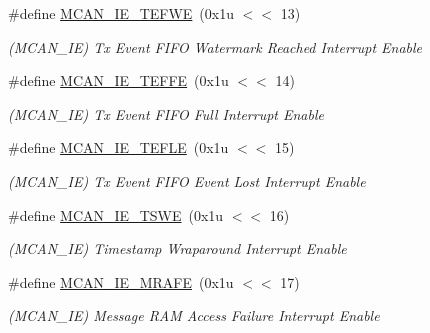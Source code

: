 \begin{DoxyCompactItemize}
\mbox{\label{group__SAME70__MCAN_ga5121f78a2022216daff6bd973c7e09e5}} 
\#define \mbox{\hyperlink{group__SAME70__MCAN_ga5121f78a2022216daff6bd973c7e09e5}{M\+C\+A\+N\+\_\+\+I\+E\+\_\+\+T\+E\+F\+WE}}~(0x1u $<$$<$ 13)
\begin{DoxyCompactList}\small\item\em (M\+C\+A\+N\+\_\+\+IE) Tx Event F\+I\+FO Watermark Reached Interrupt Enable \end{DoxyCompactList}\item 
\mbox{\label{group__SAME70__MCAN_ga192993fa1244bcfb8717d55db440943d}} 
\#define \mbox{\hyperlink{group__SAME70__MCAN_ga192993fa1244bcfb8717d55db440943d}{M\+C\+A\+N\+\_\+\+I\+E\+\_\+\+T\+E\+F\+FE}}~(0x1u $<$$<$ 14)
\begin{DoxyCompactList}\small\item\em (M\+C\+A\+N\+\_\+\+IE) Tx Event F\+I\+FO Full Interrupt Enable \end{DoxyCompactList}\item 
\mbox{\label{group__SAME70__MCAN_gac17cd252e27c0043311eb71af3a35154}} 
\#define \mbox{\hyperlink{group__SAME70__MCAN_gac17cd252e27c0043311eb71af3a35154}{M\+C\+A\+N\+\_\+\+I\+E\+\_\+\+T\+E\+F\+LE}}~(0x1u $<$$<$ 15)
\begin{DoxyCompactList}\small\item\em (M\+C\+A\+N\+\_\+\+IE) Tx Event F\+I\+FO Event Lost Interrupt Enable \end{DoxyCompactList}\item 
\mbox{\label{group__SAME70__MCAN_ga3e16fcb2d6aa7839c147c13a97cdce97}} 
\#define \mbox{\hyperlink{group__SAME70__MCAN_ga3e16fcb2d6aa7839c147c13a97cdce97}{M\+C\+A\+N\+\_\+\+I\+E\+\_\+\+T\+S\+WE}}~(0x1u $<$$<$ 16)
\begin{DoxyCompactList}\small\item\em (M\+C\+A\+N\+\_\+\+IE) Timestamp Wraparound Interrupt Enable \end{DoxyCompactList}\item 
\mbox{\label{group__SAME70__MCAN_gaa2e97232159ed775d0a0b56fcbd59a6a}} 
\#define \mbox{\hyperlink{group__SAME70__MCAN_gaa2e97232159ed775d0a0b56fcbd59a6a}{M\+C\+A\+N\+\_\+\+I\+E\+\_\+\+M\+R\+A\+FE}}~(0x1u $<$$<$ 17)
\begin{DoxyCompactList}\small\item\em (M\+C\+A\+N\+\_\+\+IE) Message R\+AM Access Failure Interrupt Enable \end{DoxyCompactList}\item 
$$
\end{DoxyCompactItemize}
